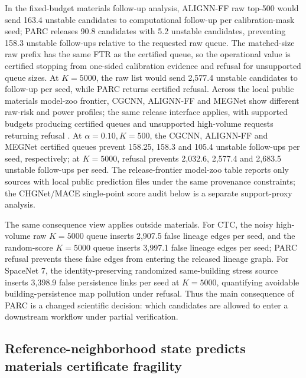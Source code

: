 \documentclass[10pt,twocolumn]{article}
\begin{document}
In the fixed-budget materials follow-up analysis, ALIGNN-FF raw top-500 would send 163.4 unstable candidates to computational follow-up per calibration-mask seed; PARC releases 90.8 candidates with 5.2 unstable candidates, preventing 158.3 unstable follow-ups relative to the requested raw queue.
The matched-size raw prefix has the same FTR as the certified queue, so the operational value is certified stopping from one-sided calibration evidence and refusal for unsupported queue sizes.
At \(K=5000\), the raw list would send 2,577.4 unstable candidates to follow-up per seed, while PARC returns certified refusal.
Across the local public materials model-zoo frontier, CGCNN, ALIGNN-FF and MEGNet show different raw-risk and power profiles; the same release interface applies, with supported budgets producing certified queues and unsupported high-volume requests returning refusal \cite{chen2019graph}.
At \(\alpha=0.10,K=500\), the CGCNN, ALIGNN-FF and MEGNet certified queues prevent 158.25, 158.3 and 105.4 unstable follow-ups per seed, respectively; at \(K=5000\), refusal prevents 2,032.6, 2,577.4 and 2,683.5 unstable follow-ups per seed.
The release-frontier model-zoo table reports only sources with local public prediction files under the same provenance constraints; the CHGNet/MACE single-point score audit below is a separate support-proxy analysis.

The same consequence view applies outside materials.
For CTC, the noisy high-volume raw \(K=5000\) queue inserts 2,907.5 false lineage edges per seed, and the random-score \(K=5000\) queue inserts 3,997.1 false lineage edges per seed; PARC refusal prevents these false edges from entering the released lineage graph.
For SpaceNet 7, the identity-preserving randomized same-building stress source inserts 3,398.9 false persistence links per seed at \(K=5000\), quantifying avoidable building-persistence map pollution under refusal.
Thus the main consequence of PARC is a changed scientific decision: which candidates are allowed to enter a downstream workflow under partial verification.

\subsection{Reference-neighborhood state predicts materials certificate fragility}
\end{document}
